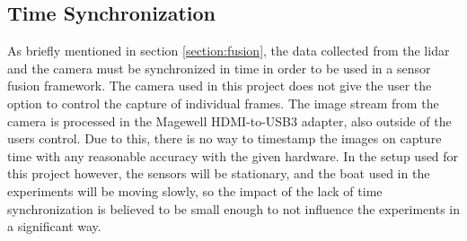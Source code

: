 \subsection{Time Synchronization}
As briefly mentioned in section \ref{section:fusion}, the data collected from the lidar and the camera must be synchronized in time in order to be used in a sensor fusion framework. The camera used in this project does not give the user the option to control the capture of individual frames. The image stream from the camera is processed in the Magewell HDMI-to-USB3 adapter, also outside of the users control. Due to this, there is no way to timestamp the images on capture time with any reasonable accuracy with the given hardware. In the setup used for this project however, the sensors will be stationary, and the boat used in the experiments will be moving slowly, so the impact of the lack of time synchronization is believed to be small enough to not influence the experiments in a significant way.
\cleardoublepage